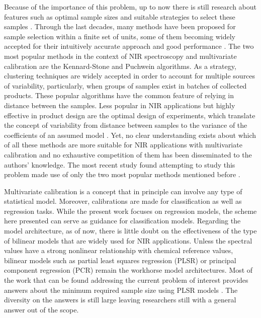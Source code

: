 \documentclass[journal=ancham,manuscript=article]{achemso}
\begin{document}
Because of the importance of this problem, up to now there is still research about features such as optimal sample sizes and suitable strategies to select these samples \cite{Au2020, Liu2019}. Through the last decades, many methods have been proposed for sample selection within a finite set of units, some of them becoming widely accepted for their intuitively accurate approach and good performance \cite{Shetty2012a, Nawar2018, He2015}. The two most popular methods in the context of NIR spectroscopy and multivariate calibration are the Kennard-Stone\cite{Kennard1969} and  Puchwein\cite{Puchwein1988} algorithms. As a strategy, clustering techniques are widely accepted in order to account for multiple sources of variability\cite{Naes1990}, particularly, when groups of samples exist in batches of collected products\cite{Bobelyn2010}. These popular algorithms have the common feature of relying in distance between the samples. Less popular in NIR applications but highly effective in product design are the optimal design of experiments, which translate the concept of variability from distance between samples to the variance of the coefficients of an assumed model \cite{Goos2011}. Yet, no clear understanding exists about which of all these methods are more suitable for NIR applications with multivariate calibration and no exhaustive competition of them has been disseminated to the authors' knowledge. The most recent study found attempting to study this problem made use of only the two most popular methods mentioned before \cite{Au2020}.

Multivariate calibration is a concept that in principle can involve any type of statistical model. Moreover, calibrations are made for classification as well as regression tasks. While the present work focuses on regression models, the scheme here presented can serve as guidance for classification models. Regarding the model architecture, as of now, there is little doubt on the effectiveness of the type of bilinear models that are widely used for NIR applications. Unless the spectral values have a strong nonlinear relationship with chemical reference values, bilinear models such as partial least squares regression (PLSR) or principal component regression (PCR) remain the workhorse model architectures. Most of the work that can be found addressing the current problem of interest provides answers about the minimum required sample size using PLSR models \cite{Naes1990, Au2020, Shetty2012a, Rodionova2008}. The diversity on the answers is still large leaving researchers still with a general answer out of the scope. 
\end{document}
